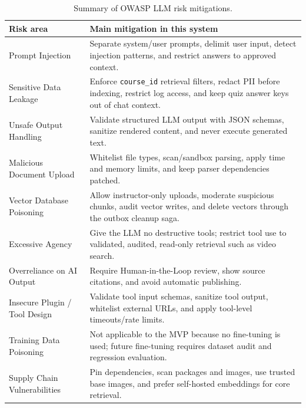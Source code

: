 \begin{table}[H]
    \centering
    \caption{Summary of OWASP LLM risk mitigations.}
    \label{tab:owasp-llm-summary}
    \begin{tabularx}{\textwidth}{|p{3.4cm}|X|}
        \hline
        \textbf{Risk area} & \textbf{Main mitigation in this system} \\
        \hline
        Prompt Injection
            & Separate system/user prompts, delimit user input, detect
              injection patterns, and restrict answers to approved context. \\
        \hline
        Sensitive Data Leakage
            & Enforce \texttt{course\_id} retrieval filters, redact PII before
              indexing, restrict log access, and keep quiz answer keys out of
              chat context. \\
        \hline
        Unsafe Output Handling
            & Validate structured LLM output with JSON schemas, sanitize
              rendered content, and never execute generated text. \\
        \hline
        Malicious Document Upload
            & Whitelist file types, scan/sandbox parsing, apply time and memory
              limits, and keep parser dependencies patched. \\
        \hline
        Vector Database Poisoning
            & Allow instructor-only uploads, moderate suspicious chunks, audit
              vector writes, and delete vectors through the outbox cleanup
              saga. \\
        \hline
        Excessive Agency
            & Give the LLM no destructive tools; restrict tool use to validated,
              audited, read-only retrieval such as video search. \\
        \hline
        Overreliance on AI Output
            & Require Human-in-the-Loop review, show source citations, and avoid
              automatic publishing. \\
        \hline
        Insecure Plugin / Tool Design
            & Validate tool input schemas, sanitize tool output, whitelist
              external URLs, and apply tool-level timeouts/rate limits. \\
        \hline
        Training Data Poisoning
            & Not applicable to the MVP because no fine-tuning is used; future
              fine-tuning requires dataset audit and regression evaluation. \\
        \hline
        Supply Chain Vulnerabilities
            & Pin dependencies, scan packages and images, use trusted base
              images, and prefer self-hosted embeddings for core retrieval. \\
        \hline
    \end{tabularx}
\end{table}

